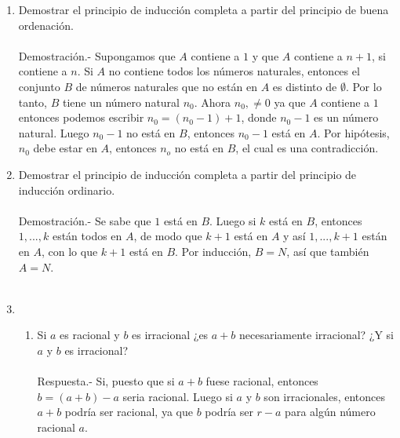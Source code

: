 \begin{enumerate}
      \item Demostrar el principio de inducción completa a partir del principio de buena ordenación.\\\\
      Demostración.-\; Supongamos que $A$ contiene a $1$ y que $A$ contiene a $n+1$, si contiene a $n$. Si $A$ no contiene todos los números naturales, entonces el conjunto $B$ de números naturales que no están en $A$ es distinto de $\emptyset$. Por lo tanto, $B$ tiene un número natural $n_0$. Ahora $n_0 ,\neq 0$ ya que $A$ contiene a $1$ entonces podemos escribir $n_0 = (n_0 -1) +1$, donde $n_0-1$ es un número natural. Luego $n_0-1$ no está en $B$, entonces $n_0 -1$ está en $A$. Por hipótesis, $n_0$ debe estar en $A$, entonces $n_o$ no está en $B$, el cual es una contradicción.             	 
      
      \item Demostrar el principio de inducción completa a partir del principio de inducción ordinario.\\\\
      Demostración.- \; Se sabe que $1$ está en $B$. Luego si $k$ está en $B$, entonces $1,...,k$ están todos en $A$, de modo que $k+1$ está en $A$ y así $1,...,k+1$ están en $A$, con lo que $k+1$ está en $B$. Por inducción, $B=N$, así que también $A=N$.\\\\

      \item 
	 \begin{enumerate}[\bfseries (a)]

	 \item Si $a$ es racional y \; $b$ es irracional ¿es $a+b$ necesariamente irracional? ¿Y si $a$ \; y \; $b$ es irracional? \\\\
	 Respuesta.- \; Si, puesto que si $a+b$ fuese racional, entonces $b=(a+b) -a$ seria racional. Luego si $a$ y $b$ son irracionales, entonces $a+b$ podría ser racional, ya que $b$ podría ser $r-a$ para algún número racional $a$.\\\\          


\end{enumerate}
\end{enumerate}
